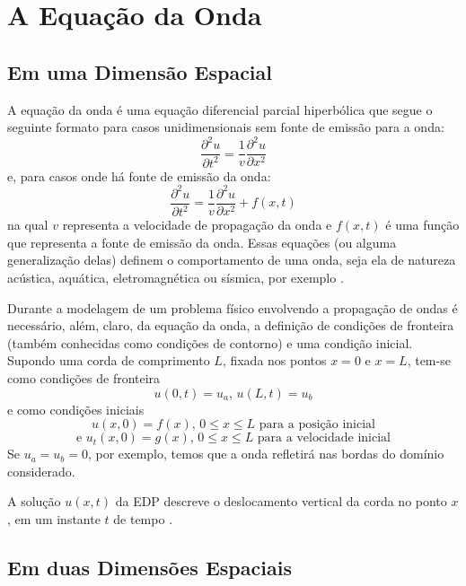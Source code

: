 	\section{A Equação da Onda}
	    \subsection{Em uma Dimensão Espacial}
    		A equação da onda é uma equação diferencial parcial hiperbólica que segue o seguinte formato para casos unidimensionais sem fonte de emissão para a onda:
    		\begin{equation}
    			\frac{\partial^2 u}{\partial t^2} = \frac{1}{v}\frac{\partial^2 u}{\partial x^2}
    			\label{eqOnda1Dh}
    		\end{equation}
    		e, para casos onde há fonte de emissão da onda:
    		\begin{equation}	
    			\frac{\partial^2 u}{\partial t^2} = \frac{1}{v}\frac{\partial^2 u}{\partial x^2} + f(x, t)
    			\label{eqOnda1Dnh}	
    		\end{equation}
    		na qual $v$ representa a velocidade de propagação da onda e $f(x, t)$  é uma função que representa a fonte de emissão da onda.
    		Essas equações (ou alguma generalização delas) definem o comportamento de uma onda, seja ela de natureza acústica, aquática, 
    		eletromagnética ou sísmica, por exemplo \cite{boyce9}.
    		
    		Durante a modelagem de um problema físico envolvendo a propagação de ondas é necessário, além, claro, da equação da onda, a definição de condições de fronteira (também conhecidas como condições de contorno) e uma condição inicial. Supondo uma corda de comprimento $L$, fixada nos pontos $x = 0$ e $x = L$, tem-se como condições de fronteira
    		\[u(0, t) = u_{a}\text{, } u(L, t) = u_{b}\]
    		e como condições iniciais
    		\[u(x, 0) = f(x)\text{, } 0\le x\le L\text{ para a posição inicial}\]
    		\[\text{e } u_{t}(x, 0) = g(x)\text{, } 0\le x\le L\text{ para a velocidade inicial}\]
            Se $u_a = u_b = 0$, por exemplo, temos que a onda refletirá nas bordas do domínio considerado.
    
    		A solução $u(x, t)$ da EDP descreve o deslocamento vertical da corda no ponto $x$, em um instante $t$ de tempo \cite{boyce9}.
		
	    \subsection{Em duas Dimensões Espaciais}
	
